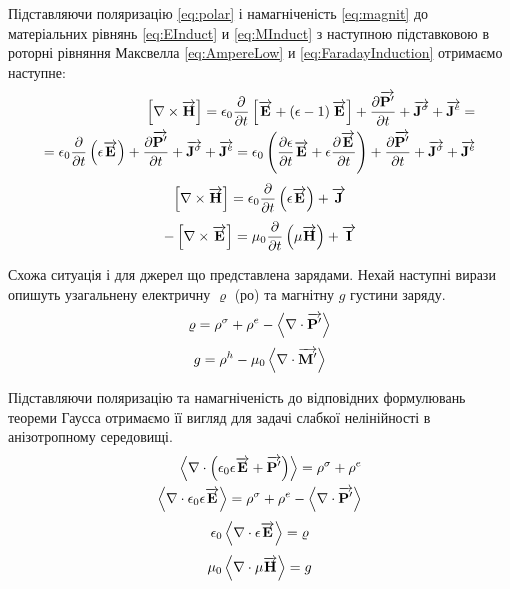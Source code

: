 Підставляючи поляризацію \eqref{eq:polar} і намагніченість 
\eqref{eq:magnit} до матеріальних рівнянь \eqref{eq:EInduct} и 
\eqref{eq:MInduct} з наступною підставковою в роторні рівняння Максвелла
\eqref{eq:AmpereLow} и \eqref{eq:FaradayInduction} отримаємо наступне: 
%
\textcolor{lightgray}{ \begin{equation*} \begin{aligned}
\left[ \nabla \times \overrightarrow{\mathbf H} \right] = \epsilon_0 \frac{\partial }{\partial t} \left[ 
\overrightarrow{\mathbf E} + \left( \epsilon - 1 \right) \overrightarrow{\mathbf E} \right] + 
\frac{\partial \overrightarrow{\mathbf P^\prime}}{\partial t} + \overrightarrow{\mathbf J^\sigma} + \overrightarrow{\mathbf J^e}= \\
= \epsilon_0 \frac{\partial }{\partial t} \left( \epsilon \overrightarrow{\mathbf E} \right) +
\frac{\partial \overrightarrow{\mathbf P^\prime}}{\partial t} + \overrightarrow{\mathbf J^\sigma} + \overrightarrow{\mathbf J^e} = 
\epsilon_0 \left( \frac{\partial \epsilon}{\partial t} 
\overrightarrow{\mathbf E} + \epsilon \frac{\partial \overrightarrow{\mathbf E}}{\partial t} \right) + 
\frac{\partial \overrightarrow{\mathbf P^\prime}}{\partial t} + \overrightarrow{\mathbf J^\sigma} + \overrightarrow{\mathbf J^e}
\end{aligned} \end{equation*} }
%
\begin{equation} \label{eq:rotHfromE}
\left[ \nabla \times \overrightarrow{\mathbf H} \right] = 
\epsilon_0 \frac{\partial }{\partial t} \left( \epsilon \overrightarrow{\mathbf E} \right) + \overrightarrow{\mathbf J}
\end{equation}
%
\begin{equation} \label{eq:rotEfromH} 
- \left[ \nabla \times \overrightarrow{\mathbf E} \right] = 
\mu_0 \frac{\partial }{\partial t} \left( \mu \overrightarrow{\mathbf H} \right) + \overrightarrow{\mathbf I}
\end{equation}

Схожа ситуація і для джерел що представлена зарядами. Нехай наступні вирази
опишуть узагальнену електричну $ \varrho $ (ро) та магнітну $ g $ густини 
заряду.
%
\begin{equation*}
\varrho = \rho^\sigma + \rho^e - \left< \nabla \cdot \overrightarrow{\mathbf P^\prime} \right>
\end{equation*}
%
\begin{equation*}
g = \rho^h - \mu_0 \left< \nabla \cdot \overrightarrow{\mathbf M^\prime} \right>
\end{equation*}

Підставляючи поляризацію та намагніченість до відповідних формулювань теореми 
Гаусса отримаємо її вигляд для задачі слабкої нелінійності в анізотропному 
середовищі.
%
\textcolor{lightgray}{ \begin{equation*} \begin{aligned}
\left< \nabla \cdot  \left( \epsilon_0 \epsilon \overrightarrow{\mathbf E} + 
\overrightarrow{\mathbf P^\prime} \right)  \right> = \rho^\sigma + \rho^e \\
\left< \nabla \cdot  \epsilon_0 \epsilon \overrightarrow{\mathbf E}  \right> = \rho^\sigma + \rho^e -
\left< \nabla \cdot  \overrightarrow{\mathbf P^\prime}  \right>
\end{aligned} \end{equation*} }
%
\begin{equation} \label{eq:divE} 
\epsilon_0 \left< \nabla \cdot  \epsilon \overrightarrow{\mathbf E}  \right> = \varrho
\end{equation}
%
\begin{equation} \label{eq:divH}
\mu_0 \left< \nabla \cdot  \mu \overrightarrow{\mathbf H}  \right> = g
\end{equation}

